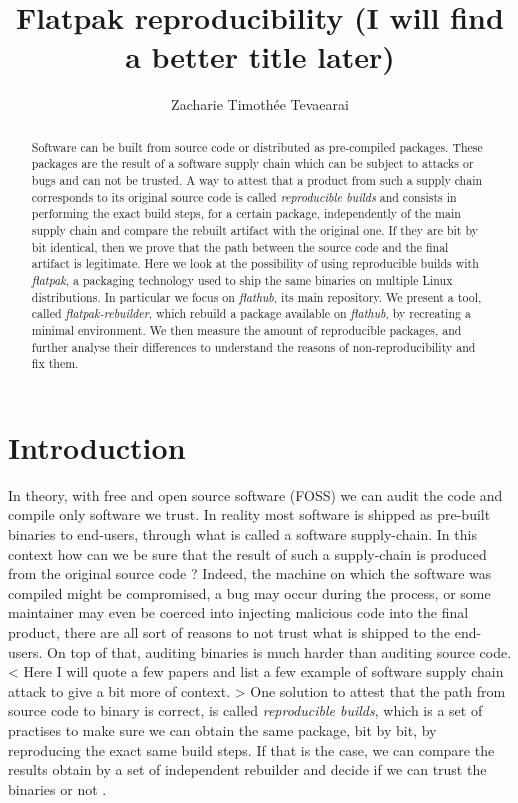 \documentclass[a4paper,11pt,oneside]{report}
\title{Flatpak reproducibility (I will find a better title later)}
\author{Zacharie Timothée Tevaearai}
\newcommand{\sysname}{\emph{flatpak-rebuilder}\xspace}
\newcommand{\rb}{\emph{reproducible builds}\xspace}
\newcommand{\fp}{\emph{flatpak}\xspace}
\newcommand{\fh}{\emph{flathub}\xspace}
\begin{document}
\maketitle
\makededication

\begin{abstract}
Software can be built from source code or distributed as pre-compiled packages.
    These packages are the result of a software supply chain which can be
    subject to attacks or bugs and can not be trusted. A way to attest that a
    product from such a supply chain corresponds to its original source code is
    called \rb and consists in performing the exact build steps, for a certain
    package, independently of the main supply chain and compare the rebuilt
    artifact with the original one. If they are bit by bit identical, then we
    prove that the path between the source code and the final artifact is
    legitimate. Here we look at the possibility of using reproducible builds
    with \fp, a packaging technology used to ship the same binaries on multiple
    Linux distributions. In particular we focus on \fh, its main repository. We
    present a tool, called \sysname, which rebuild a package available on \fh,
    by recreating a minimal environment. We then measure the amount of
    reproducible packages, and further analyse their differences to understand
    the reasons of non-reproducibility and fix them.
\end{abstract}

\maketoc

\chapter{Introduction}

In theory, with free and open source software (FOSS) we can audit the code and
compile only software we trust. In reality most software is shipped as
pre-built binaries to end-users, through what is called a software
supply-chain. In this context how can we be sure that the result of such a
supply-chain is produced from the original source code ? Indeed, the
machine on which the software was compiled might be compromised, a bug may
occur during the process, or some maintainer may even be coerced into injecting
malicious code into the final product, there are all sort of reasons to not
trust what is shipped to the end-users. On top of that, auditing binaries is
much harder than auditing source code.
< Here I will quote a few papers and list a few example of software supply chain attack to give a bit more of context. >
One solution to attest that the path from source code to binary is correct, is
called \rb, which is a set of practises to make sure we can obtain the same
package, bit by bit, by reproducing the exact same build steps. If that is the
case, we can compare the results obtain by a set of independent rebuilder and
decide if we can trust the binaries or not \cite{DBLP:journals/corr/abs-2104-06020}.
\end{document}
